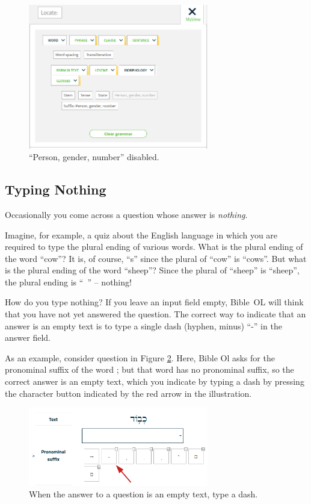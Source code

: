 \documentclass[11pt,oneside,a4paper]{memoir}
\newcommand{\heb}[1]{{\RL {\ezr #1}}}
\begin{document}
\begin{figure}
  \begin{center}
    \includegraphics[width=0.7\textwidth]{fig-no-gender.png}
  \end{center}
  \caption{``Person, gender, number'' disabled.}\label{fig-no-gender}
\end{figure}


\subsection{Typing Nothing}

Occasionally you come across a question whose answer is \emph{nothing}.

Imagine, for example, a quiz about the English language in which you are required to type the plural
ending of various words. What is the plural ending of the word ``cow''? It is, of course, ``s'' since
the plural of ``cow'' is ``cows''. But what is the plural ending of the word ``sheep''? Since the plural
of ``sheep'' is ``sheep'', the plural ending is ``~'' -- nothing!

How do you type nothing? If you leave an input field empty, Bible~OL will think that you have not
yet answered the question. The correct way to indicate that an answer is an empty text is to type a
single dash (hyphen, minus) ``-'' in the answer field.

As an example, consider question in Figure \ref{fig-empty-answer}. Here, Bible Ol asks for the
pronominal suffix of the word \heb{כְבֹ֥וד}; but that word has no pronominal suffix, so the correct
answer is an empty text, which you indicate by typing a dash by pressing the character button
indicated by the red arrow in the illustration.

\begin{figure}
  \begin{center}
    \includegraphics[width=0.7\textwidth]{fig-empty-answer.png}
  \end{center}
  \caption{When the answer to a question is an empty text, type a dash.}\label{fig-empty-answer}
\end{figure}
\end{document}
